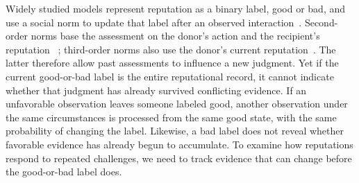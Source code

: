 \documentclass[fleqn,10pt]{wlscirep}
\begin{document}

Widely studied models represent reputation as a binary label, good or bad, and use a social norm to update that label after an observed interaction~\cite{nowak2005,ohtsuki2004,hilbe2018}. Second-order norms base the assessment on the donor's action and the recipient's reputation ~\cite{pacheco2006,ohtsuki2007}; third-order norms also use the donor's current reputation~\cite{brandt2004,ohtsuki2006}. The latter therefore allow past assessments to influence a new judgment. Yet if the current good-or-bad label is the entire reputational record, it cannot indicate whether that judgment has already survived conflicting evidence. If an unfavorable observation leaves someone labeled good, another observation under the same circumstances is processed from the same good state, with the same probability of changing the label. Likewise, a bad label does not reveal whether favorable evidence has already begun to accumulate. To examine how reputations respond to repeated challenges, we need to track evidence that can change before the good-or-bad label does.
\end{document}

